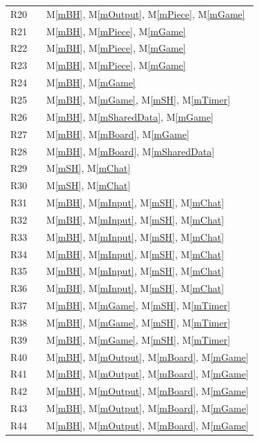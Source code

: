 \documentclass[12pt, titlepage]{article}
\newcommand{\mref}[1]{M\ref{#1}}
\begin{document}
\begin{center}
\begin{longtable}{l l l}
        R20 && \mref{mBH}, \mref{mOutput}, \mref{mPiece}, \mref{mGame}\\
        R21 && \mref{mBH}, \mref{mPiece}, \mref{mGame}\\
        R22 && \mref{mBH}, \mref{mPiece}, \mref{mGame}\\
        R23 && \mref{mBH}, \mref{mPiece}, \mref{mGame}\\
        R24 && \mref{mBH}, \mref{mGame}\\
        R25 && \mref{mBH}, \mref{mGame}, \mref{mSH}, \mref{mTimer}\\
        R26 && \mref{mBH}, \mref{mSharedData}, \mref{mGame}\\
        R27 && \mref{mBH}, \mref{mBoard}, \mref{mGame}\\
        R28 && \mref{mBH}, \mref{mBoard}, \mref{mSharedData}\\
        R29 && \mref{mSH}, \mref{mChat}\\
        R30 && \mref{mSH}, \mref{mChat}\\
        R31 && \mref{mBH}, \mref{mInput}, \mref{mSH}, \mref{mChat}\\
        R32 && \mref{mBH}, \mref{mInput}, \mref{mSH}, \mref{mChat}\\
        R33 && \mref{mBH}, \mref{mInput}, \mref{mSH}, \mref{mChat}\\
        R34 && \mref{mBH}, \mref{mInput}, \mref{mSH}, \mref{mChat}\\
        R35 && \mref{mBH}, \mref{mInput}, \mref{mSH}, \mref{mChat}\\
        R36 && \mref{mBH}, \mref{mInput}, \mref{mSH}, \mref{mChat}\\
        R37 && \mref{mBH}, \mref{mGame}, \mref{mSH}, \mref{mTimer}\\
        R38 && \mref{mBH}, \mref{mGame}, \mref{mSH}, \mref{mTimer}\\
        R39 && \mref{mBH}, \mref{mGame}, \mref{mSH}, \mref{mTimer}\\
        R40 && \mref{mBH}, \mref{mOutput}, \mref{mBoard}, \mref{mGame}\\
        R41 && \mref{mBH}, \mref{mOutput}, \mref{mBoard}, \mref{mGame}\\
        R42 && \mref{mBH}, \mref{mOutput}, \mref{mBoard}, \mref{mGame}\\
        R43 && \mref{mBH}, \mref{mOutput}, \mref{mBoard}, \mref{mGame}\\
        R44 && \mref{mBH}, \mref{mOutput}, \mref{mBoard}, \mref{mGame}\\

\end{longtable}
\end{center}
\end{document}
